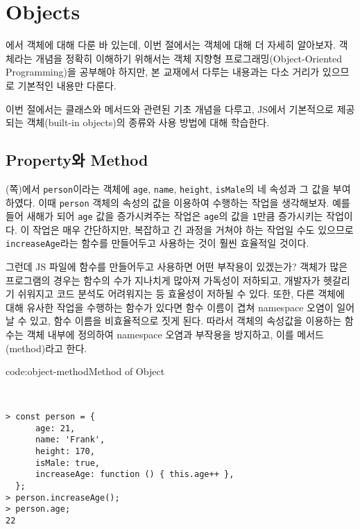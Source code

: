 \section{Objects} \label{sect:objects}

에서 객체에 대해 다룬 바 있는데, 이번 절에서는 객체에 대해 더 자세히 알아보자. 객체라는 개념을 정확히 이해하기 위해서는 객체 지향형 프로그래밍(Object-Oriented Programming)을 공부해야 하지만, 본 교재에서 다루는 내용과는 다소 거리가 있으므로 기본적인 내용만 다룬다.

이번 절에서는 클래스와 메서드와 관련된 기초 개념을 다루고, JS에서 기본적으로 제공되는 객체(built-in objects)의 종류와 사용 방법에 대해 학습한다.

\subsection*{Property와 Method}

(\pageref{code:object-type}쪽)에서 \texttt{person}이라는 객체에 \texttt{age}, \texttt{name}, \texttt{height}, \texttt{isMale}의 네 속성과 그 값을 부여하였다. 이때 \texttt{person} 객체의 속성의 값을 이용하여 수행하는 작업을 생각해보자. 예를 들어 새해가 되어 \texttt{age} 값을 증가시켜주는 작업은 \texttt{age}의 값을 \texttt{1}만큼 증가시키는 작업이다. 이 작업은 매우 간단하지만, 복잡하고 긴 과정을 거쳐야 하는 작업일 수도 있으므로 \texttt{increaseAge}라는 함수를 만들어두고 사용하는 것이 훨씬 효율적일 것이다.

그런데 JS 파일에 함수를 만들어두고 사용하면 어떤 부작용이 있겠는가? 객체가 많은 프로그램의 경우는 함수의 수가 지나치게 많아져 가독성이 저하되고, 개발자가 헷갈리기 쉬워지고 코드 분석도 어려워지는 등 효율성이 저하될 수 있다. 또한, 다른 객체에 대해 유사한 작업을 수행하는 함수가 있다면 함수 이름이 겹쳐 namespace 오염이 일어날 수 있고, 함수 이름을 비효율적으로 짓게 된다. 따라서 객체의 속성값을 이용하는 함수는 객체 내부에 정의하여 namespace 오염과 부작용을 방지하고, 이를 메서드(method)라고 한다.

\begin{codeenv}{code:object-method}{Method of Object}\begin{verbatim}


> const person = {
      age: 21,
      name: 'Frank',
      height: 170,
      isMale: true,
      increaseAge: function () { this.age++ },
  };
> person.increaseAge();
> person.age;
22
\end{verbatim}
\end{codeenv}

